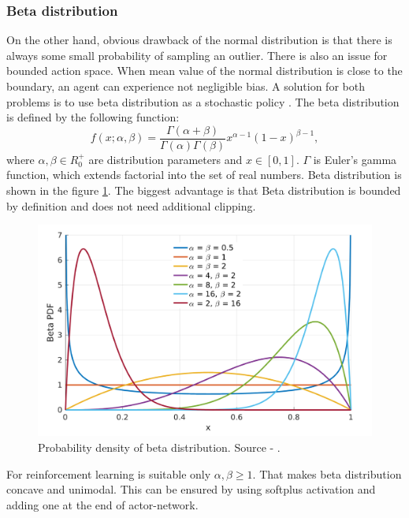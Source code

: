 \subsubsection{Beta distribution}
On the other hand, obvious drawback of the normal distribution is that there is always some small probability of sampling an outlier. There is also an issue for bounded action space. When mean value of the normal distribution is close to the boundary, an agent can experience not negligible bias. A solution for both problems is to use beta distribution as a stochastic policy \cite{chou17}. The beta distribution is defined by the following function:
\begin{equation}
f(x;\alpha, \beta) = \frac{\Gamma(\alpha + \beta)}{\Gamma(\alpha)\Gamma(\beta)}x^{\alpha-1}(1-x)^{\beta-1},
\end{equation}
where $\alpha,\beta \in R^+_0$ are distribution parameters and $x \in [0, 1]$. $\Gamma$ is Euler's gamma function, which extends factorial into the set of real numbers. Beta distribution is shown in the figure \ref{fig:beta}. The biggest advantage is that Beta distribution is bounded by definition and does not need additional clipping.

\begin{figure}[H]
\centering
\includegraphics[scale=0.2]{fig/beta.png}
\caption[Probability density of beta distribution]{Probability density of beta distribution. Source - \cite{chou17}.}
\label{fig:beta}
\end{figure}

For reinforcement learning is suitable only $\alpha, \beta \geq 1$. That makes beta distribution concave and unimodal. This can be ensured by using softplus activation and adding one at the end of actor-network.

